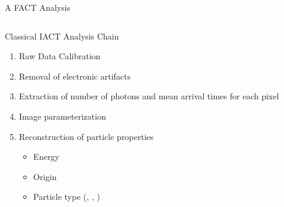 \documentclass[compress, 9pt, aspectratio=1610, professionalfonts]{beamer}
\begin{document}
\begin{frame}[t]{A FACT Analysis}
  \begin{columns}[onlytextwidth]
    \begin{column}{0.475\textwidth}
      Classical IACT Analysis Chain
      \begin{enumerate}
        \item Raw Data Calibration
        \item Removal of electronic artifacts
        \item Extraction of number of photons and mean arrival times for each pixel
        \item Image parameterization
        \item Reconstruction of particle properties
          \begin{itemize}
            \item Energy
            \item Origin
            \item Particle type (\Photon, \Proton, \Muon)
          \end{itemize}
      \end{enumerate}
    \end{column}
    \hfill
    \begin{column}{0.475\textwidth}%

\end{column}
\end{columns}
\end{frame}
\end{document}
